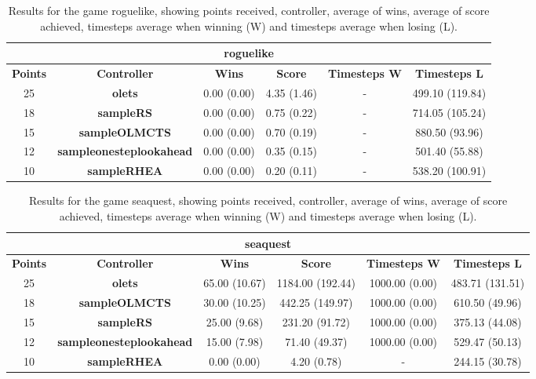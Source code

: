 \begin{table*}[!t]
\begin{center}
\begin{tabular}{|c|c|c|c|c|c|}
\multicolumn{6}{c}{\textbf{roguelike}}\\
\hline
\textbf{Points} & \textbf{Controller} & \textbf{Wins} &  \textbf{Score} & \textbf{Timesteps W} & \textbf{Timesteps L}\\
\hline
25 & \textbf{olets} & 0.00 (0.00) & 4.35 (1.46) &  -  & 499.10 (119.84)
 \\
\hline
18 & \textbf{sampleRS} & 0.00 (0.00) & 0.75 (0.22) &  -  & 714.05 (105.24)
 \\
\hline
15 & \textbf{sampleOLMCTS} & 0.00 (0.00) & 0.70 (0.19) &  -  & 880.50 (93.96)
 \\
\hline
12 & \textbf{sampleonesteplookahead} & 0.00 (0.00) & 0.35 (0.15) &  -  & 501.40 (55.88)
 \\
\hline
10 & \textbf{sampleRHEA} & 0.00 (0.00) & 0.20 (0.11) &  -  & 538.20 (100.91)
 \\
\hline
\end{tabular}
\caption{Results for the game roguelike, showing points received, controller, average of wins, average of score achieved, timesteps average when winning (W) and timesteps average when losing (L).}
\label{tab:weights}
\end{center}
\end{table*}
\begin{table*}[!t]
\begin{center}
\begin{tabular}{|c|c|c|c|c|c|}
\multicolumn{6}{c}{\textbf{seaquest}}\\
\hline
\textbf{Points} & \textbf{Controller} & \textbf{Wins} &  \textbf{Score} & \textbf{Timesteps W} & \textbf{Timesteps L}\\
\hline
25 & \textbf{olets} & 65.00 (10.67) & 1184.00 (192.44) & 1000.00 (0.00) & 483.71 (131.51)
 \\
\hline
18 & \textbf{sampleOLMCTS} & 30.00 (10.25) & 442.25 (149.97) & 1000.00 (0.00) & 610.50 (49.96)
 \\
\hline
15 & \textbf{sampleRS} & 25.00 (9.68) & 231.20 (91.72) & 1000.00 (0.00) & 375.13 (44.08)
 \\
\hline
12 & \textbf{sampleonesteplookahead} & 15.00 (7.98) & 71.40 (49.37) & 1000.00 (0.00) & 529.47 (50.13)
 \\
\hline
10 & \textbf{sampleRHEA} & 0.00 (0.00) & 4.20 (0.78) &  -  & 244.15 (30.78)
 \\
\hline
\end{tabular}
\caption{Results for the game seaquest, showing points received, controller, average of wins, average of score achieved, timesteps average when winning (W) and timesteps average when losing (L).}
\label{tab:weights}
\end{center}
\end{table*}
